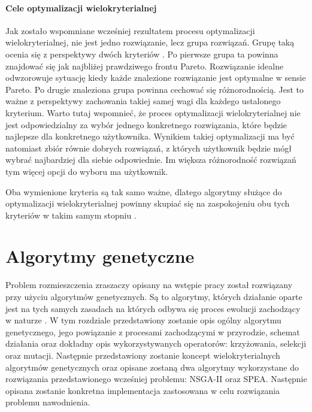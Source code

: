 \documentclass[twoside]{iisthesis}
\begin{document}
\subsubsection{Cele optymalizacji wielokryterialnej}
Jak zostało wspomniane wcześniej rezultatem procesu optymalizacji wielokryterialnej, nie jest jedno rozwiązanie, lecz grupa rozwiązań. Grupę taką ocenia się z perspektywy dwóch kryteriów \cite{book}. Po pierwsze grupa ta powinna znajdować się jak najbliżej prawdziwego frontu Pareto. Rozwiązanie idealne odwzorowuje sytuację kiedy każde znalezione rozwiązanie jest optymalne w sensie Pareto. Po drugie znaleziona grupa powinna cechować się różnorodnością. Jest to ważne z perspektywy zachowania takiej samej wagi dla każdego ustalonego kryterium. Warto tutaj wspomnieć, że proces optymalizacji wielokryterialnej nie jest odpowiedzialny za wybór jednego konkretnego rozwiązania, które będzie najlepsze dla konkretnego użytkownika. Wynikiem takiej optymalizacji ma być natomiast zbiór równie dobrych rozwiązań, z których użytkownik będzie mógł wybrać najbardziej dla siebie odpowiednie. Im większa różnorodność rozwiązań tym więcej opcji do wyboru ma użytkownik.

Oba wymienione kryteria są tak samo ważne, dlatego algorytmy służące do optymalizacji wielokryterialnej powinny skupiać się na zaspokojeniu obu tych kryteriów w takim samym stopniu \cite{book}.

\chapter{Algorytmy genetyczne}
Problem rozmieszczenia zraszaczy opisany na wstępie pracy został rozwiązany przy użyciu algorytmów genetycznych. Są to algorytmy, których działanie oparte jest na tych samych zasadach na których odbywa się proces ewolucji zachodzący w naturze \cite{ga_book}. W tym rozdziale przedstawiony zostanie opis ogólny algorytmu genetycznego, jego powiązanie z procesami zachodzącymi w przyrodzie, schemat działania oraz dokładny opis wykorzystywanych operatorów: krzyżowania, selekcji oraz mutacji. Następnie przedstawiony zostanie koncept wielokryterialnych algorytmów genetycznych oraz opisane zostaną dwa algorytmy wykorzystane do rozwiązania przedstawionego wcześniej problemu: NSGA-II oraz SPEA. Następnie opisana zostanie konkretna implementacja zastosowana w celu rozwiązania problemu nawodnienia.
\end{document}
